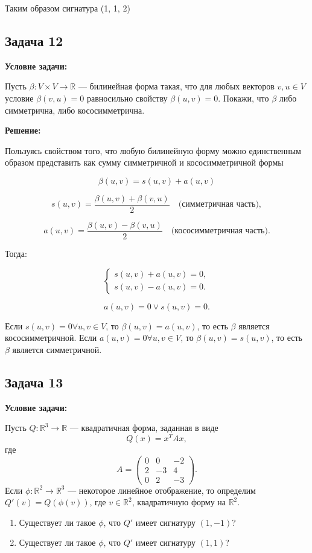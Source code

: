 \documentclass[a4paper,12pt]{article}
\begin{document}
Таким образом сигнатура (1, 1, 2)



\vspace{1cm}

\subsection{Задача 12}
\textbf{Условие задачи:}

Пусть $\beta : V \times V \to \mathbb{R}$ — билинейная форма такая, что для любых векторов $v, u \in V$ условие $\beta(v, u) = 0$ равносильно свойству $\beta(u, v) = 0$. Покажи, что $\beta$ либо симметрична, либо кососимметрична.

\textbf{Решение:}

Пользуясь свойством того, что любую билинейную форму можно единственным образом представить как сумму симметричной и кососимметричной формы

\[
\beta(u, v) = s(u, v) + a(u, v)
\]

\[
s(u, v) = \frac{\beta(u, v) + \beta(v, u)}{2} \quad \text{(симметричная часть)},
\]

\[
a(u, v) = \frac{\beta(u, v) - \beta(v, u)}{2} \quad \text{(кососимметричная часть)}.
\]

Тогда:

\[
\begin{cases}
s(u, v) + a(u, v) = 0, \\
s(u, v) - a(u, v) = 0.
\end{cases}
\]

\[
a(u, v) = 0 \lor s(u, v) = 0.
\]

Если $s(u, v) = 0 \forall u, v \in V$, то \(\beta(u, v) = a(u, v)\), то есть \(\beta\) является кососимметричной.
Если $a(u, v) = 0 \forall u, v \in V$, то \(\beta(u, v) = s(u, v)\), то есть \(\beta\) является симметричной.


\vspace{1cm}

\subsection{Задача 13}
\textbf{Условие задачи:}

Пусть $Q: \mathbb{R}^3 \to \mathbb{R}$ — квадратичная форма, заданная в виде
$$
Q(x) = x^T A x,
$$
где
$$
A =
\begin{pmatrix}
0 & 0 & -2 \\
2 & -3 & 4 \\
0 & 2 & -3
\end{pmatrix}.
$$
Если $\phi: \mathbb{R}^2 \to \mathbb{R}^3$ — некоторое линейное отображение, то определим $Q'(v) = Q(\phi(v))$, где $v \in \mathbb{R}^2$, квадратичную форму на $\mathbb{R}^2$.
\begin{enumerate}
    \item Существует ли такое $\phi$, что $Q'$ имеет сигнатуру $(1, -1)$?
    \item Существует ли такое $\phi$, что $Q'$ имеет сигнатуру $(1, 1)$?
\end{enumerate}
\end{document}
